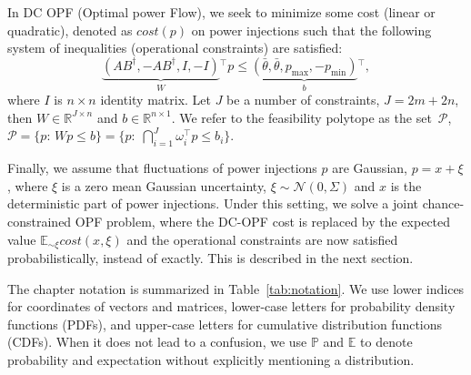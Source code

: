 In DC OPF (Optimal power Flow), we seek to minimize some cost (linear or quadratic), denoted as $\textit{cost}(p)$ on power injections such that the following system of inequalities (operational constraints) are satisfied: 
\[
\underbrace{(AB^\dagger, - A B^\dagger, I, -I)}_{W}\!\!{}^\top p \le \underbrace{(\bar\theta, \bar\theta, p_{\max}, -p_{\min})}_b\!\!{}^\top,
\]
where $I$ is $n\times n$ identity matrix. Let $J$ be a number of constraints, $J = 2m + 2n$, then $W\in\mathbb{R}^{J\times n}$ and $b\in\mathbb{R}^{n\times 1}$. We refer to the feasibility polytope as the set~$\mathcal{P}$, 
$\mathcal{P} = \bigl\{p:\, Wp \le b\bigr\} = \bigl\{p:\; \bigcap_{i=1}^J\omega_i^\top p \le b_i\bigr\}$.

Finally, we assume that fluctuations of power injections $p$ are Gaussian, $p = x +\xi$, where $\xi$ is a zero mean Gaussian uncertainty, $\xi\sim\mathcal{N}(0, \Sigma)$ and $x$ is the deterministic part of power injections. Under this setting, we solve a joint chance-constrained OPF problem, where the DC-OPF cost is replaced by the expected value $\mathbb{E}_{\sim \xi}\textit{cost}(x,\xi)$ and the operational constraints are now satisfied probabilistically, instead of exactly. This is described in the next section.

The chapter notation is summarized in Table~\ref{tab:notation}. We use lower indices for coordinates of vectors and matrices, lower-case letters for probability density functions (PDFs), and upper-case letters for cumulative distribution functions (CDFs). When it does not lead to a confusion, we use $\mathbb{P}$ and $\mathbb{E}$ to denote probability and expectation without explicitly mentioning a distribution. 

